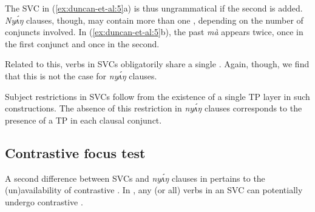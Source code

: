 \documentclass[output=paper,modfonts,nonflat,
hidelinks
]{langsci/langscibook}
\begin{document}
\noindent The SVC in (\ref{ex:duncan-et-al:5}a) is thus ungrammatical if the second  is added. \textit{Ny\'{ʌ}ŋ} clauses, though, may contain more than one , depending on the number of conjuncts involved. In (\ref{ex:duncan-et-al:5}b), the past  \textit{mà} appears twice, once in the first conjunct and once in the second.

Related to this, verbs in  SVCs obligatorily share a single . Again, though, we find that this is not the case for \textit{ny\'{ʌ}ŋ} clauses.

\ea\label{ex:duncan-et-al:6}
\z
\z

\noindent Subject restrictions in  SVCs follow from the existence of a single TP layer in such constructions. The absence of this restriction in \textit{ny\'{ʌ}ŋ} clauses corresponds to the presence of a TP in each clausal conjunct.

\subsection{Contrastive focus test}\label{sec:duncan-et-al:2.2}

A second difference between SVCs and \textit{ny\'{ʌ}ŋ} clauses in  pertains to the (un)availability of contrastive . In , any (or all) verbs in an SVC can potentially undergo contrastive .

\ea\label{ex:duncan-et-al:7}
\z
\z
\end{document}

